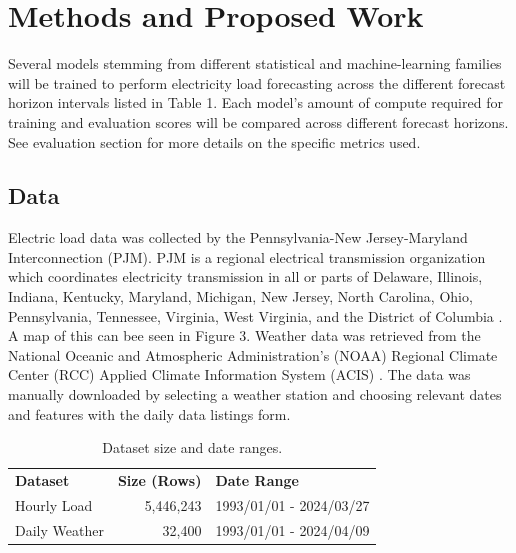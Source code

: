 \documentclass[sigconf]{acmart}
\begin{document}
\section{Methods and Proposed Work}
Several models stemming from different statistical and machine-learning families will be trained to perform electricity load forecasting across the different forecast horizon intervals listed in Table 1. Each model's amount of compute required for training and evaluation scores will be compared across different forecast horizons. See evaluation section for more details on the specific metrics used.

  \subsection{Data}
  Electric load data was collected by the Pennsylvania-New Jersey-Maryland Interconnection (PJM). PJM is a regional electrical transmission organization which coordinates electricity transmission in all or parts of Delaware, Illinois, Indiana, Kentucky, Maryland, Michigan, New Jersey, North Carolina, Ohio, Pennsylvania, Tennessee, Virginia, West Virginia, and the District of Columbia \cite{PJMZone24}. A map of this can bee seen in Figure 3.
  Weather data was retrieved from the National Oceanic and Atmospheric Administration's (NOAA) Regional Climate Center (RCC) Applied Climate Information System (ACIS) \cite{ACIS}. The data was manually downloaded by selecting a weather station and choosing relevant dates and features with the daily data listings form. 
  
  \begin{table}[hbt!]
\centering
\caption{Dataset size and date ranges.}
\begin{tabular}{lrl}
\toprule
\textbf{Dataset} & \hfil \textbf{Size (Rows)} & \textbf{Date Range} \\
\cmidrule(rl){1-1}\cmidrule(rl){2-2}\cmidrule(rl){3-3}
  Hourly Load & 5,446,243 & 1993/01/01 - 2024/03/27 \\
  Daily Weather & 32,400 & 1993/01/01 - 2024/04/09  \\   
  \bottomrule
\end{tabular}
\end{table}
  
\end{document}
